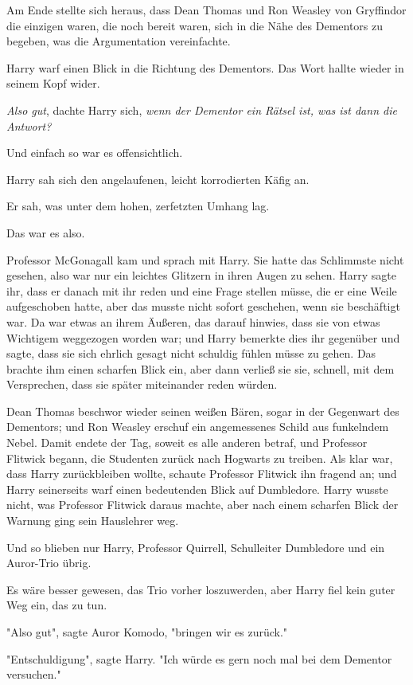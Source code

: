{Am Ende stellte sich heraus, dass Dean Thomas und Ron Weasley von Gryffindor die einzigen waren, die noch bereit waren, sich in die Nähe des Dementors zu begeben, was die Argumentation vereinfachte.

Harry warf einen Blick in die Richtung des Dementors. Das Wort hallte wieder in seinem Kopf wider.

\emph{Also gut}, dachte Harry sich, \emph{wenn der Dementor ein Rätsel ist, was ist dann die Antwort?}

Und einfach so war es offensichtlich.

Harry sah sich den angelaufenen, leicht korrodierten Käfig an.

Er sah, was unter dem hohen, zerfetzten Umhang lag.

Das war es also.

Professor McGonagall kam und sprach mit Harry. Sie hatte das Schlimmste nicht gesehen, also war nur ein leichtes Glitzern in ihren Augen zu sehen. Harry sagte ihr, dass er danach mit ihr reden und eine Frage stellen müsse, die er eine Weile aufgeschoben hatte, aber das musste nicht sofort geschehen, wenn sie beschäftigt war. Da war etwas an ihrem Äußeren, das darauf hinwies, dass sie von etwas Wichtigem weggezogen worden war; und Harry bemerkte dies ihr gegenüber und sagte, dass sie sich ehrlich gesagt nicht schuldig fühlen müsse zu gehen. Das brachte ihm einen scharfen Blick ein, aber dann verließ sie sie, schnell, mit dem Versprechen, dass sie später miteinander reden würden.

Dean Thomas beschwor wieder seinen weißen Bären, sogar in der Gegenwart des Dementors; und Ron Weasley erschuf ein angemessenes Schild aus funkelndem Nebel. Damit endete der Tag, soweit es alle anderen betraf, und Professor Flitwick begann, die Studenten zurück nach Hogwarts zu treiben. Als klar war, dass Harry zurückbleiben wollte, schaute Professor Flitwick ihn fragend an; und Harry seinerseits warf einen bedeutenden Blick auf Dumbledore. Harry wusste nicht, was Professor Flitwick daraus machte, aber nach einem scharfen Blick der Warnung ging sein Hauslehrer weg.

Und so blieben nur Harry, Professor Quirrell, Schulleiter Dumbledore und ein Auror-Trio übrig.

Es wäre besser gewesen, das Trio vorher loszuwerden, aber Harry fiel kein guter Weg ein, das zu tun.

"Also gut", sagte Auror Komodo, "bringen wir es zurück."

"Entschuldigung", sagte Harry. "Ich würde es gern noch mal bei dem Dementor versuchen."

}
